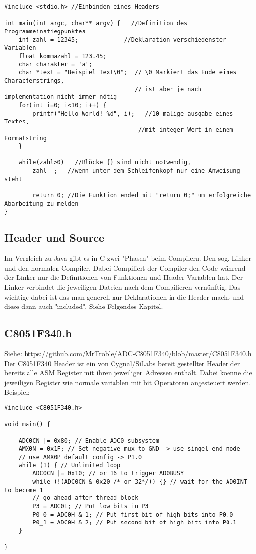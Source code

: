 \documentclass{article}
\begin{document}
\begin{verbatim}
#include <stdio.h> //Einbinden eines Headers

int main(int argc, char** argv) {	//Definition des Programmeinstiegpunktes
    int zahl = 12345;             //Deklaration verschiedenster Variablen
    float kommazahl = 123.45;      	
    char charakter = 'a';
    char *text = "Beispiel Text\0";  // \0 Markiert das Ende eines Characterstrings,
                                     // ist aber je nach implementation nicht immer nötig
    for(int i=0; i<10; i++) {
        printf("Hello World! %d", i);	//10 malige ausgabe eines Textes,
                                      //mit integer Wert in einem Formatstring
    }
	
    while(zahl>0)	//Blöcke {} sind nicht notwendig,
        zahl--;   //wenn unter dem Schleifenkopf nur eine Anweisung steht
		
	    return 0; //Die Funktion ended mit "return 0;" um erfolgreiche Abarbeitung zu melden
}
\end{verbatim}

\subsection{Header und Source}

Im Vergleich zu Java gibt es in C zwei "Phasen" beim Compilern. Den sog. Linker und den normalen Compiler. Dabei Compiliert der Compiler den Code während der Linker nur die Definitionen von Funktionen und Header Variablen hat. Der Linker verbindet die jeweiligen Dateien nach dem Compilieren vernünftig. Das wichtige dabei ist das man generell nur Deklarationen in die Header macht und diese dann auch "included". Siehe Folgendes Kapitel.
\newpage
\subsection{C8051F340.h}
Siehe: https://github.com/MrTroble/ADC-C8051F340/blob/master/C8051F340.h
\newline\newline
Der C8051F340 Header ist ein von Cygnal/SiLabs bereit gestellter Header der bereits alle ASM Register mit ihren jeweiligen Adressen enthält. Dabei koenne die jeweiligen Register wie normale variablen mit bit Operatoren angesteuert werden. Beispiel:
\begin{verbatim}
#include <C8051F340.h>

void main() {

    ADC0CN |= 0x80; // Enable ADC0 subsystem
    AMX0N = 0x1F; // Set negative mux to GND -> use singel end mode
    // use AMX0P default config -> P1.0
    while (1) { // Unlimited loop
        ADC0CN |= 0x10; // or 16 to trigger AD0BUSY
        while (!(ADC0CN & 0x20 /* or 32*/)) {} // wait for the AD0INT to become 1
        // go ahead after thread block
        P3 = ADC0L; // Put low bits in P3
        P0_0 = ADC0H & 1; // Put first bit of high bits into P0.0
        P0_1 = ADC0H & 2; // Put second bit of high bits into P0.1
    }
    
}
\end{verbatim}
\end{document}
